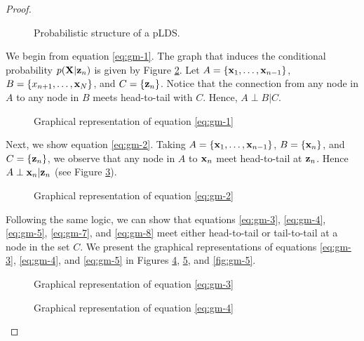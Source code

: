 \documentclass[12pt, oneside]{book}
\numberwithin{equation}{section}
\newcommand{\x}{{\bf x}}
\newcommand{\X}{{\bf X}}
\newcommand{\z}{{\bf z}}
\begin{document}
{\begin{proof}
	\begin{figure}[h!]
		\centering
		\resizebox{\columnwidth}{!}{}
		\caption{Probabilistic structure of a pLDS.}
		\label{fig:lds-skeleton}
	\end{figure}

	We begin from equation \eqref{eq:gm-1}. The graph that induces the conditional probability $p(\X \vert \z_n)$ is given by Figure \ref{fig:gm-1}. Let $A = \{\x_1, \ldots, \x_{n-1}\}$, $B = \{x_{n+1}, \ldots, \x_N\}$, and $C = \{\z_n\}$. Notice that the connection from any node in $A$ to any node in $B$ meets head-to-tail with $C$. Hence, $A \perp B \vert C$.
	
	\begin{figure}[h!]
		\centering
		\resizebox{\columnwidth}{!}{}
		\caption{Graphical representation of equation \eqref{eq:gm-1}}
		\label{fig:gm-1}
	\end{figure}
	
	Next, we show equation \eqref{eq:gm-2}. Taking $A = \{\x_1, \ldots, \x_{n-1}\}$, $B = \{\x_n\}$, and $C = \{\z_n\}$, we observe that any node in $A$ to $\x_n$ meet head-to-tail at $\z_n$. Hence $A \perp \x_n \vert \z_n$ (see Figure \ref{fig:gm-2}). 
	\begin{figure}[h!]
		\centering
		\resizebox{\columnwidth}{!}{}
		\caption{Graphical representation of equation \eqref{eq:gm-2}}
		\label{fig:gm-2}
	\end{figure}

	Following the same logic, we can show that equations \eqref{eq:gm-3}, \eqref{eq:gm-4}, \eqref{eq:gm-5}, \eqref{eq:gm-7}, and \eqref{eq:gm-8}  meet either head-to-tail or tail-to-tail at a node in the set $C$. We present the graphical representations of equations \eqref{eq:gm-3}, \eqref{eq:gm-4}, and \eqref{eq:gm-5} in Figures \ref{fig:gm-3}, \ref{fig:gm-4}, and \ref{fig:gm-5}.
	\begin{figure}[h!]
		\centering
		\resizebox{\columnwidth}{!}{}
		\caption{Graphical representation of equation \eqref{eq:gm-3}}
		\label{fig:gm-3}
	\end{figure}
	
	\begin{figure}[h!]
		\centering
		\resizebox{\columnwidth}{!}{}
		\caption{Graphical representation of equation \eqref{eq:gm-4}}
		\label{fig:gm-4}
	\end{figure}
	

\end{proof}}
\end{document}
